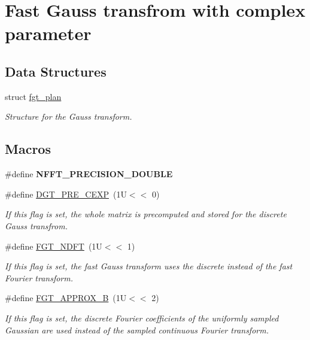 \hypertarget{group__applications__fastgauss}{\section{Fast Gauss transfrom with complex parameter}
\label{group__applications__fastgauss}
}
\subsection*{Data Structures}
\begin{DoxyCompactItemize}
\item 
struct \hyperlink{structfgt__plan}{fgt\-\_\-plan}
\begin{DoxyCompactList}\small\item\em Structure for the Gauss transform. \end{DoxyCompactList}\end{DoxyCompactItemize}
\subsection*{Macros}
\begin{DoxyCompactItemize}
\item 
\hypertarget{group__applications__fastgauss_ga21e7edc135c60cac3649215ba80a27e2}{\#define {\bfseries N\-F\-F\-T\-\_\-\-P\-R\-E\-C\-I\-S\-I\-O\-N\-\_\-\-D\-O\-U\-B\-L\-E}}\label{group__applications__fastgauss_ga21e7edc135c60cac3649215ba80a27e2}

\item 
\#define \hyperlink{group__applications__fastgauss_ga48aa1ec81a29b9f079701246f0b53ccc}{D\-G\-T\-\_\-\-P\-R\-E\-\_\-\-C\-E\-X\-P}~(1\-U$<$$<$ 0)
\begin{DoxyCompactList}\small\item\em If this flag is set, the whole matrix is precomputed and stored for the discrete Gauss transfrom. \end{DoxyCompactList}\item 
\#define \hyperlink{group__applications__fastgauss_ga38ab7e1022ff3c5b556ce93078a05d1e}{F\-G\-T\-\_\-\-N\-D\-F\-T}~(1\-U$<$$<$ 1)
\begin{DoxyCompactList}\small\item\em If this flag is set, the fast Gauss transform uses the discrete instead of the fast Fourier transform. \end{DoxyCompactList}\item 
\#define \hyperlink{group__applications__fastgauss_ga39c3e544a78853e0da2b9a8c66d3054d}{F\-G\-T\-\_\-\-A\-P\-P\-R\-O\-X\-\_\-\-B}~(1\-U$<$$<$ 2)
\begin{DoxyCompactList}\small\item\em If this flag is set, the discrete Fourier coefficients of the uniformly sampled Gaussian are used instead of the sampled continuous Fourier transform. \end{DoxyCompactList}\end{DoxyCompactItemize}
